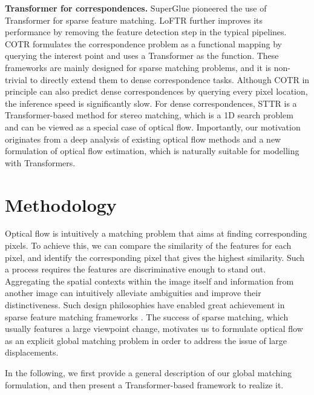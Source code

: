 \documentclass[10pt,twocolumn,letterpaper]{article}
\begin{document}
{\bf Transformer for correspondences.} SuperGlue \cite{sarlin2020superglue} pioneered the use of Transformer for sparse feature matching. LoFTR \cite{sun2021loftr} further improves its performance by removing the feature detection step in the typical pipelines. COTR \cite{jiang2021cotr} formulates the correspondence problem as a functional mapping by querying the interest point and uses a Transformer as the function. These frameworks are mainly designed for sparse matching problems, and it is non-trivial to directly extend them to dense correspondence tasks. Although COTR in principle can also predict dense correspondences by querying every pixel location, the inference speed is significantly slow. For dense correspondences, STTR \cite{li2021revisiting} is a Transformer-based method for stereo matching, which is a 1D search problem and can be viewed as a special case of optical flow. Importantly, our motivation originates from a deep analysis of existing optical flow methods and a new formulation of optical flow estimation, which is naturally suitable for modelling with Transformers.






\section{Methodology}
Optical flow is intuitively a matching problem that aims at finding corresponding pixels. To achieve this, we can compare the similarity of the features for each pixel, and identify the corresponding pixel that gives the highest similarity. Such a process requires the features are discriminative enough to stand out. Aggregating the spatial contexts within the image itself and information from another image can intuitively alleviate ambiguities and improve their distinctiveness. Such design philosophies have enabled great achievement in sparse feature matching frameworks \cite{sarlin2020superglue,sun2021loftr}. The success of sparse matching, which usually features a large viewpoint change, motivates us to formulate optical flow as an explicit global matching problem in order to address the issue of large displacements.

In the following, we first provide a general description of our global matching formulation, and then present a Transformer-based framework to realize it.
\end{document}
